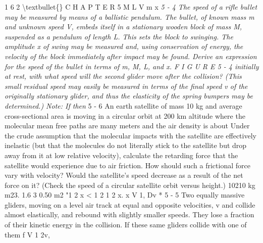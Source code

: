 \documentclass[10pt,oneside]{article}
\begin{document}
1 6 2 \textbackslash{}textbullet\{\} C H A P T E R  5 M L V m x \emph{ } \emph{ 5 - 4 The speed of a rifle bullet may be measured by means of a ballistic pendulum. The bullet, of known mass m and unknown speed V, embeds itself in a stationary wooden block of mass M, suspended as a pendulum of length L. This sets the block to swinging. The amplitude x of swing may be measured and, using conservation of energy, the velocity of the block immediately after impact may be found. Derive an expression for the speed of the bullet in terms of m, M, L, and x. F I G U R E  5 - 4 initially at rest, with what speed will the second glider move after the collision? (This small residual speed may easily be measured in terms of the final speed v of the originally stationary glider, and thus the elasticity of the spring bumpers may be determined.) Note: If then } \emph{ } 5 - 6 An earth satellite of mass 10 kg and average cross-sectional area is moving in a circular orbit at 200 km altitude where the molecular mean free paths are many meters and the air density is about Under the crude assumption that the molecular impacts with the satellite are effectively inelastic (but that the molecules do not literally stick to the satellite but drop away from it at low relative velocity), calculate the retarding force that the satellite would experience due to air friction. How should such a frictional force vary with velocity? Would the satellite’s speed decrease as a result of the net force on it? (Check the speed of a circular satellite orbit versus height.) 10210 kg m23. 1.6 3 0.50 m2 "1 2 x < 1 2 1 2 x. x V 1, Dv \emph{ } * 5 - 5 Two equally massive gliders, moving on a level air track at equal and opposite velocities, v and collide almost elastically, and rebound with slightly smaller speeds. They lose a fraction of their kinetic energy in the collision. If these same gliders collide with one of them f V 1 2v,\par
\end{document}
